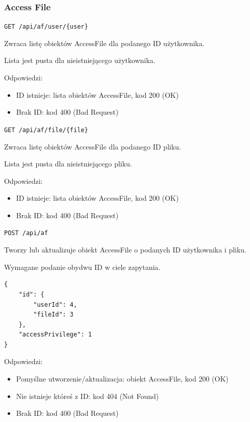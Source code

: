 \documentclass[a4paper,twoside,12pt]{book}
\begin{document}
\subsubsection{Access File}\label{access-file}

\label{get-accessfile-by-user}

\texttt{GET\ /api/af/user/\{user\}}

Zwraca listę obiektów AccessFile dla podanego ID użytkownika.

Lista jest pusta dla nieistniejącego użytkownika.

Odpowiedzi: 
\begin{itemize}
	\item ID istnieje: lista obiektów AccessFile, kod 200 (OK) 
	\item Brak ID: kod 400 (Bad Request)
\end{itemize}

\label{get-accessfile-by-file}

\texttt{GET\ /api/af/file/\{file\}}

Zwraca listę obiektów AccessFile dla podanego ID pliku.

Lista jest pusta dla nieistniejącego pliku.

Odpowiedzi: 
\begin{itemize}
	\item ID istnieje: lista obiektów AccessFile, kod 200 (OK) 
	\item Brak ID: kod 400 (Bad Request)
\end{itemize}

\label{modify-accessfile}

\texttt{POST\ /api/af}

Tworzy lub aktualizuje obiekt AccessFile o podanych ID użytkownika i pliku.

Wymagane podanie obydwu ID w ciele zapytania.

\begin{verbatim}
{
    "id": {
        "userId": 4,
        "fileId": 3
    },
    "accessPrivilege": 1
}
\end{verbatim}

Odpowiedzi: 
\begin{itemize}
	\item Pomyślne utworzenie/aktualizacja: obiekt AccessFile, kod 200 (OK) 
	\item Nie istnieje któreś z ID: kod 404 (Not Found) 
	\item Brak ID: kod 400 (Bad Request)
\end{itemize}
\end{document}
